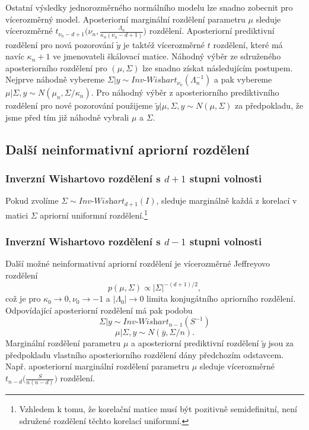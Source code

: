 Ostatní výsledky jednorozměrného normálního modelu lze snadno zobecnit pro vícerozměrný model. Aposteriorní marginální rozdělení parametru $\mu$ sleduje vícerozměrné $t_{\nu_n - d + 1}\Big(\nu_n, \frac{\Lambda_n}{\kappa_n(\nu_n - d + 1)}\Big)$ rozdělení. Aposteriorní prediktivní rozdělení pro nová pozorování $\tilde{y}$ je taktéž vícerozměrné $t$ rozdělení, které má navíc $\kappa_n + 1$ ve jmenovateli škálovací matice. Náhodný výběr ze sdruženého aposteriorního rozdělení pro $(\mu, \Sigma)$ lze snadno získat následujícím postupem. Nejprve náhodně vybereme $\Sigma | y \sim \textit{Inv-Wishart}_{\nu_n}(\Lambda_n^{-1})$ a pak vybereme $\mu | \Sigma, y \sim N(\mu_n, \Sigma / \kappa_n)$. Pro náhodný výběr z aposteriorního prediktivního rozdělení pro nové pozorování použijeme $\tilde{y} | \mu, \Sigma, y \sim N(\mu, \Sigma)$ za předpokladu, že jsme před tím již náhodně vybrali $\mu$ a $\Sigma$.

\subsection{Další neinformativní apriorní rozdělení}

\subsubsection{Inverzní Wishartovo rozdělení s $d + 1$ stupni volnosti}

Pokud zvolíme $\Sigma \sim \textit{Inv-Wishart}_{d + 1}(I)$, sleduje marginálně každá z korelací v matici $\Sigma$ apriorní uniformní rozdělení.\footnote{Vzhledem k tomu, že korelační matice musí být pozitivně semidefinitní, není sdružené rozdělení těchto korelací uniformní.}

\subsubsection{Inverzní Wishartovo rozdělení s $d - 1$ stupni volnosti}

Další možné neinformativní apriorní rozdělení je vícerozměrné Jeffreyovo rozdělení
\begin{equation}
p(\mu, \Sigma) \varpropto |\Sigma|^{-(d + 1)/2},
\end{equation}
což je pro $\kappa_0 \rightarrow 0, \nu_0 \rightarrow -1$ a $|\Lambda_0| \rightarrow 0$ limita konjugátního apriorního rozdělení. Odpovídající aposteriorní rozdělení má pak podobu
\begin{equation}
\Sigma | y \sim \textit{Inv-Wishart}_{n - 1}(S^{-1})
\end{equation}
\begin{equation}
\mu | \Sigma, y \sim N(\overline{y}, \Sigma / n).
\end{equation}
Marginální rozdělení parametru $\mu$ a aposteriorní prediktivní rozdělení $\tilde{y}$ jsou za předpokladu vlastního aposteriorního rozdělení dány předchozím odstavcem. Např. aposteriorní marginální rozdělení parametru $\mu$ sleduje vícerozměrné $t_{n - d}\Big(\frac{S}{n(n - d)}\Big)$ rozdělení.

